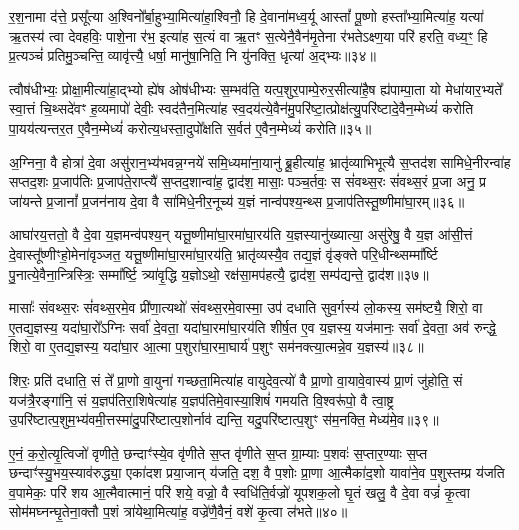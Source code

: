 र॒श॒नामा द॑त्ते॒ प्रसू᳚त्या अ॒श्विनो᳚र्बा॒हुभ्या॒मित्या॑हा॒श्विनौ॒ हि दे॒वाना॑मध्व॒र्यू आस्तां᳚ पू॒ष्णो हस्ता᳚भ्या॒मित्या॑ह॒ यत्या॑ ऋ॒तस्य॑ त्वा देवहविः॒ पाशे॒ना र॑भ॒ इत्या॑ह स॒त्यं वा ऋ॒तꣳ स॒त्येनै॒वैन॑मृ॒तेना र॑भते\-ऽक्ष्ण॒या परि॑ हरति॒ वध्य॒ꣳ॒ हि प्र॒त्यञ्चं॑ प्रतिमु॒ञ्चन्ति॒ व्यावृ॑त्त्यै॒ धर्\mbox{}षा॒ मानु॑षा॒निति॒ नि यु॑नक्ति॒ धृत्या॑ अ॒द्भ्यः॥३४॥

त्वौष॑धीभ्यः॒ प्रोक्षा॒मीत्या॑हा॒द्भ्यो ह्ये॑ष ओष॑धीभ्यः स॒म्भव॑ति॒ यत्प॒शुर॒पाम्पे॒रुर॒सीत्या॑है॒ष ह्य॑पाम्पा॒ता यो मेधा॑यार॒भ्यते᳚ स्वा॒त्तं चि॒थ्सदे॑वꣳ ह॒व्यमापो॑ देवीः॒ स्वद॑तैन॒मित्या॑ह स्व॒दय॑त्ये॒वैन॑मु॒परि॑ष्टा॒त्प्रोक्ष॑त्यु॒परि॑ष्टादे॒वैन॒म्मेध्यं॑ करोति पा॒यय॑त्यन्तर॒त ए॒वैन॒म्मेध्यं॑ करोत्य॒धस्ता॒दुपो᳚क्षति स॒र्वत॑ ए॒वैन॒म्मेध्यं॑ करोति॥३५॥

{\anuvakamend[{वसू॒निति॑ प्रस॒व इत्य॒द्भ्यो᳚\-ऽन्तर॒त ए॒वैन॒न्दश॑ च}]}%

अ॒ग्निना॒ वै होत्रा॑ दे॒वा असु॑रान॒भ्य॑भवन्न॒ग्नये॑ समि॒ध्यमा॑ना॒यानु॑ ब्रू॒हीत्या॑ह॒ भ्रातृ॑व्याभिभूत्यै स॒प्तद॑श सामिधे॒नीरन्वा॑ह सप्तद॒शः प्र॒जाप॑तिः प्र॒जाप॑ते॒राप्त्यै॑ स॒प्तद॒शान्वा॑ह॒ द्वाद॑श॒ मासाः॒ पञ्च॒र्तवः॒ स सं॑वथ्स॒रः सं॑वथ्स॒रं प्र॒जा अनु॒ प्र जा॑यन्ते प्र॒जानां᳚ प्र॒जन॑नाय दे॒वा वै सा॑मिधे॒नीर॒नूच्य॑ य॒ज्ञं नान्व॑पश्य॒न्थ्स प्र॒जाप॑तिस्तू॒ष्णीमा॑घा॒रम्॥३६॥

आघा॑रय॒त्ततो॒ वै दे॒वा य॒ज्ञमन्व॑पश्य॒न् यत्तू॒ष्णीमा॑घा॒रमा॑घा॒रय॑ति य॒ज्ञस्यानु॑ख्यात्या॒ असु॑रेषु॒ वै य॒ज्ञ आ॑सी॒त्तं दे॒वास्तू᳚ष्णीꣳहो॒मेना॑वृञ्जत॒ यत्तू॒ष्णीमा॑घा॒रमा॑घा॒रय॑ति॒ भ्रातृ॑व्यस्यै॒व तद्य॒ज्ञं वृ॑ङ्क्ते परि॒धीन्थ्सम्मा᳚र्ष्टि पु॒नात्ये॒वैना॒न्त्रिस्त्रिः॒ सम्मा᳚र्ष्टि॒ त्र्या॑वृ॒द्धि य॒ज्ञो\-ऽथो॒ रक्ष॑सा॒मप॑हत्यै॒ द्वाद॑श॒ सम्प॑द्यन्ते॒ द्वाद॑श॥३७॥

मासाः᳚ संवथ्स॒रः सं॑वथ्स॒रमे॒व प्री॑णा॒त्यथो॑ संवथ्स॒रमे॒वास्मा॒ उप॑ दधाति सुव॒र्गस्य॑ लो॒कस्य॒ सम॑ष्ट्यै॒ शिरो॒ वा ए॒तद्य॒ज्ञस्य॒ यदा॑घा॒रो᳚\-ऽग्निः सर्वा॑ दे॒वता॒ यदा॑घा॒रमा॑घा॒रय॑ति शीर्\mbox{}ष॒त ए॒व य॒ज्ञस्य॒ यज॑मानः॒ सर्वा॑ दे॒वता॒ अव॑ रुन्द्धे॒ शिरो॒ वा ए॒तद्य॒ज्ञस्य॒ यदा॑घा॒र आ॒त्मा प॒शुरा॑घा॒रमा॒घार्य॑ प॒शुꣳ सम॑नक्त्या॒त्मन्ने॒व य॒ज्ञस्य॑॥३८॥

शिरः॒ प्रति॑ दधाति॒ सं ते᳚ प्रा॒णो वा॒युना॑ गच्छता॒मित्या॑ह वायुदेव॒त्यो॑ वै प्रा॒णो वा॒यावे॒वास्य॑ प्रा॒णं जु॑होति॒ सं यज॑त्रै॒रङ्गा॑नि॒ सं य॒ज्ञप॑तिरा॒शिषेत्या॑ह य॒ज्ञप॑तिमे॒वास्या॒शिषं॑ गमयति वि॒श्वरू॑पो॒ वै त्वा॒ष्ट्र उ॒परि॑ष्टात्प॒शुम॒भ्य॑वमी॒त्तस्मा॑दु॒परि॑ष्टात्प॒शोर्नाव॑ द्यन्ति॒ यदु॒परि॑ष्टात्प॒शुꣳ स॑म॒नक्ति॒ मेध्य॑मे॒व॥३९॥

ए॒नं॒ क॒रो॒त्यृ॒त्विजो॑ वृणीते॒ छन्दाꣳ॑स्ये॒व वृ॑णीते स॒प्त वृ॑णीते स॒प्त ग्रा॒म्याः प॒शवः॑ स॒प्तार॒ण्याः स॒प्त छन्दाꣳ॑स्यु॒भय॒स्याव॑रुद्ध्या॒ एका॑दश प्रया॒जान् य॑जति॒ दश॒ वै प॒शोः प्रा॒णा आ॒त्मैका॑द॒शो यावा॑ने॒व प॒शुस्तम्प्र य॑जति व॒पामेकः॒ परि॑ शय आ॒त्मैवात्मानं॒ परि॑ शये॒ वज्रो॒ वै स्वधि॑ति॒र्वज्रो॑ यूपशक॒लो घृ॒तं खलु॒ वै दे॒वा वज्रं॑ कृ॒त्वा सोम॑मघ्नन्घृ॒तेना॒क्तौ प॒शं त्रा॑येथा॒मित्या॑ह॒ वज्रे॑णै॒वैनं॒ वशे॑ कृ॒त्वा ल॑भते॥४०॥

